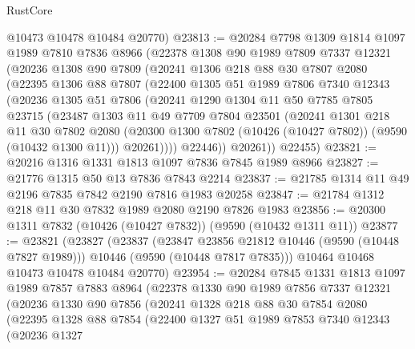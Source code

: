 \begin{lexlean}{RustCore}
\begin{coremodule}
      @10473
      @10478
      @10484
      @20770)
@23813 := @20284
    @7798
    @1309
    @1814
    @1097
    @1989
    @7810
    @7836
    @8966
    (@22378
      @1308
      @90
      @1989
      @7809
      @7337
      @12321
      (@20236
        @1308
        @90
        @7809
        (@20241
          @1306
          @218
          @88
          @30
          @7807
          @2080
          (@22395
            @1306
            @88
            @7807
            (@22400
              @1305
              @51
              @1989
              @7806
              @7340
              @12343
              (@20236
                @1305
                @51
                @7806
                (@20241
                  @1290
                  @1304
                  @11
                  @50
                  @7785
                  @7805
                  @23715
                  (@23487
                    @1303
                    @11
                    @49
                    @7709
                    @7804
                    @23501
                    (@20241
                      @1301
                      @218
                      @11
                      @30
                      @7802
                      @2080
                      (@20300 @1300 @7802 (@10426 (@10427 @7802)) (@9590 (@10432 @1300 @11)))
                      @20261))))
              @22446))
          @20261))
      @22455)
@23821 := @20216 @1316 @1331 @1813 @1097 @7836 @7845 @1989 @8966
@23827 := @21776 @1315 @50 @13 @7836 @7843 @2214
@23837 := @21785 @1314 @11 @49 @2196 @7835 @7842 @2190 @7816 @1983 @20258
@23847 := @21784 @1312 @218 @11 @30 @7832 @1989 @2080 @2190 @7826 @1983
@23856 := @20300 @1311 @7832 (@10426 (@10427 @7832)) (@9590 (@10432 @1311 @11))
@23877 := @23821
    (@23827
      (@23837
        (@23847 @23856 @21812 @10446 (@9590 (@10448 @7827 @1989)))
        @10446
        (@9590 (@10448 @7817 @7835)))
      @10464
      @10468
      @10473
      @10478
      @10484
      @20770)
@23954 := @20284
    @7845
    @1331
    @1813
    @1097
    @1989
    @7857
    @7883
    @8964
    (@22378
      @1330
      @90
      @1989
      @7856
      @7337
      @12321
      (@20236
        @1330
        @90
        @7856
        (@20241
          @1328
          @218
          @88
          @30
          @7854
          @2080
          (@22395
            @1328
            @88
            @7854
            (@22400
              @1327
              @51
              @1989
              @7853
              @7340
              @12343
              (@20236
                @1327

\end{coremodule}
\end{lexlean}
